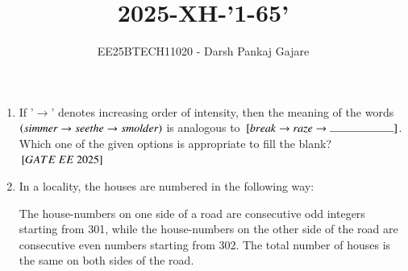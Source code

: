 \documentclass[journal,12pt,onecolumn]{IEEEtran}
\theoremstyle{remark}
\begin{document}
\title{2025-XH-'1-65'}
\author{EE25BTECH11020 - Darsh Pankaj Gajare}
\maketitle
\begin{enumerate}

\item If '$\rightarrow $' denotes increasing order of intensity, then the meaning of the words $\left(simmer \rightarrow  seethe \rightarrow  smolder\right)$ is analogous to $\sbrak{break \rightarrow  raze \rightarrow  \rule{2cm}{0.4pt} }$. Which one of the given options is appropriate to fill the blank? 
\hfill ${}\left[GATE\ EE\ 2025\right]$
    \begin{enumerate}
  \end{enumerate}
   \item In a locality, the houses are numbered in the following way:

The house-numbers on one side of a road are consecutive odd integers starting from 301, while the house-numbers on the other side of the road are consecutive even numbers starting from 302. The total number of houses is the same on both sides of the road.


\end{enumerate}
\end{document}
